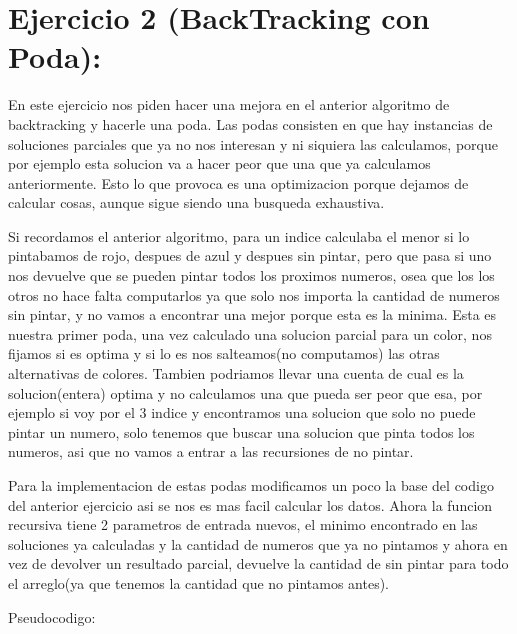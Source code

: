 \section{Ejercicio 2 (BackTracking con Poda):}

En este ejercicio nos piden hacer una mejora en el anterior algoritmo de backtracking y hacerle una poda. Las podas consisten en que hay instancias de soluciones parciales que ya no nos interesan y ni siquiera las calculamos, porque por ejemplo esta solucion va a hacer peor que una que ya calculamos anteriormente. Esto lo que provoca es una optimizacion porque dejamos de calcular cosas, aunque sigue siendo una busqueda exhaustiva.

Si recordamos el anterior algoritmo, para un indice calculaba el menor si lo pintabamos de rojo, despues de azul y despues sin pintar, pero que pasa si uno nos devuelve que se pueden pintar todos los proximos numeros, osea que los los otros no hace falta computarlos ya que solo nos importa la cantidad de numeros sin pintar, y no vamos a encontrar una mejor porque esta es la minima. Esta es nuestra primer poda, una vez calculado una solucion parcial para un color, nos fijamos si es optima y si lo es nos salteamos(no computamos) las otras alternativas de colores.	Tambien podriamos llevar una cuenta de cual es la solucion(entera) optima y no calculamos una que pueda ser peor que esa, por ejemplo si voy por el 3 indice y encontramos una solucion que solo no puede pintar un numero, solo tenemos que buscar una solucion que pinta todos los numeros, asi que no vamos a entrar a las recursiones de no pintar.

Para la implementacion de estas podas modificamos un poco la base del codigo del anterior ejercicio asi se nos es mas facil calcular los datos. Ahora la funcion recursiva tiene 2 parametros de entrada nuevos, el minimo encontrado en las soluciones ya calculadas y la cantidad de numeros que ya no pintamos y ahora en vez de devolver un resultado parcial, devuelve la cantidad de sin pintar para todo el arreglo(ya que tenemos la cantidad que no pintamos antes).

Pseudocodigo:


